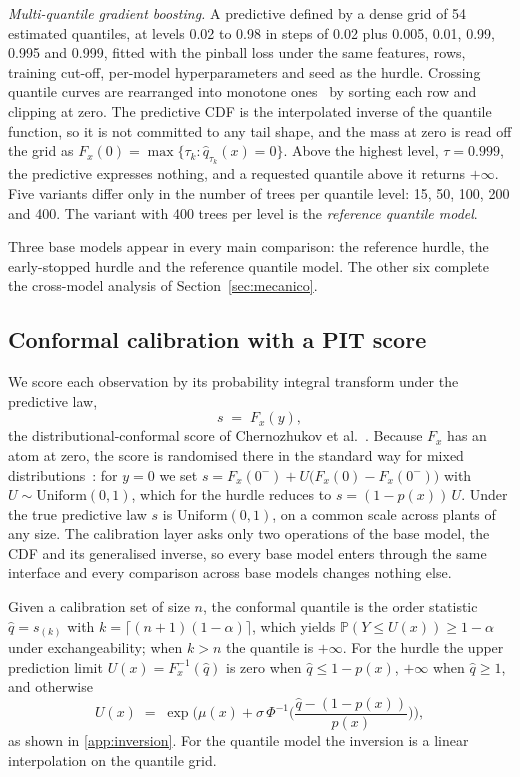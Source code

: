 \emph{Multi-quantile gradient boosting.} A predictive defined by a dense grid of 54 estimated quantiles, at levels 0.02 to 0.98 in steps of 0.02 plus 0.005, 0.01, 0.99, 0.995 and 0.999, fitted with the pinball loss under the same features, rows, training cut-off, per-model hyperparameters and seed as the hurdle. Crossing quantile curves are rearranged into monotone ones~\cite{chernozhukov2010} by sorting each row and clipping at zero. The predictive CDF is the interpolated inverse of the quantile function, so it is not committed to any tail shape, and the mass at zero is read off the grid as $F_x(0)=\max\{\tau_k:\hat q_{\tau_k}(x)=0\}$. Above the highest level, $\tau=0.999$, the predictive expresses nothing, and a requested quantile above it returns $+\infty$. Five variants differ only in the number of trees per quantile level: 15, 50, 100, 200 and 400. The variant with 400 trees per level is the \emph{reference quantile model}.

Three base models appear in every main comparison: the reference hurdle, the early-stopped hurdle and the reference quantile model. The other six complete the cross-model analysis of Section~\ref{sec:mecanico}.

\subsection{Conformal calibration with a PIT score}
\label{sec:pit}

We score each observation by its probability integral transform under the predictive law,
\begin{equation}
s \;=\; F_x(y),
\label{eq:pit}
\end{equation}
the distributional-conformal score of Chernozhukov et al.~\cite{chernozhukov2021}. Because $F_x$ has an atom at zero, the score is randomised there in the standard way for mixed distributions~\cite{smith1985}: for $y=0$ we set $s=F_x(0^-)+U\big(F_x(0)-F_x(0^-)\big)$ with $U\sim\mathrm{Uniform}(0,1)$, which for the hurdle reduces to $s=(1-p(x))\,U$. Under the true predictive law $s$ is $\mathrm{Uniform}(0,1)$, on a common scale across plants of any size. The calibration layer asks only two operations of the base model, the CDF and its generalised inverse, so every base model enters through the same interface and every comparison across base models changes nothing else.

Given a calibration set of size $n$, the conformal quantile is the order statistic $\hat q=s_{(k)}$ with $k=\lceil (n+1)(1-\alpha)\rceil$, which yields $\mathbb{P}(Y \le U(x)) \ge 1-\alpha$ under exchangeability; when $k>n$ the quantile is $+\infty$. For the hurdle the upper prediction limit $U(x)=F_x^{-1}(\hat q)$ is zero when $\hat q\le 1-p(x)$, $+\infty$ when $\hat q\ge 1$, and otherwise
\begin{equation}
U(x) \;=\; \exp\!\Big(\mu(x) + \sigma\,\Phi^{-1}\!\big(\textstyle\frac{\hat q-(1-p(x))}{p(x)}\big)\Big),
\label{eq:invert}
\end{equation}
as shown in \ref{app:inversion}. For the quantile model the inversion is a linear interpolation on the quantile grid.

